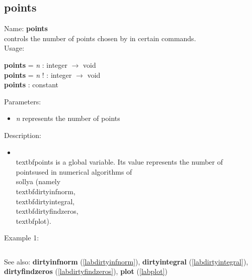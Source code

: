 \subsection{points}
\label{labpoints}
\noindent Name: \textbf{points}\\
controls the number of points chosen by \sollya in certain commands.\\
\noindent Usage: 
\begin{center}
\textbf{points} = \emph{n} : \textsf{integer} $\rightarrow$ \textsf{void}\\
\textbf{points} = \emph{n} ! : \textsf{integer} $\rightarrow$ \textsf{void}\\
\textbf{points} : \textsf{constant}\\
\end{center}
Parameters: 
\begin{itemize}
\item \emph{n} represents the number of points
\end{itemize}
\noindent Description: \begin{itemize}

\item \\textbf{points} is a global variable. Its value represents the number of points\n   used in numerical algorithms of \\sollya (namely \\textbf{dirtyinfnorm},\n   \\textbf{dirtyintegral}, \\textbf{dirtyfindzeros}, \\textbf{plot}).\n\end{itemize}
\noindent Example 1: 
\begin{center}\begin{minipage}{15cm}\begin{Verbatim}[frame=single]
\end{Verbatim}
\end{minipage}\end{center}
See also: \textbf{dirtyinfnorm} (\ref{labdirtyinfnorm}), \textbf{dirtyintegral} (\ref{labdirtyintegral}), \textbf{dirtyfindzeros} (\ref{labdirtyfindzeros}), \textbf{plot} (\ref{labplot})
